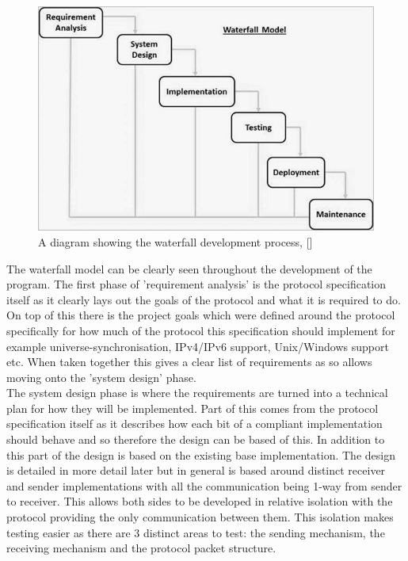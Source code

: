 \documentclass[11pt,a4paper]{article}
\begin{document}
\begin{figure}
	\includegraphics[width=\textwidth]{sdlc_waterfall_model.jpg}
	\caption{A diagram showing the waterfall development process, [\cite{waterfall-diagram}]}
	\label{waterfall-diag}
\end{figure}

The waterfall model can be clearly seen throughout the development of the program. The first phase of 'requirement analysis' is the protocol specification itself as it clearly lays out the goals of the protocol and what it is required to do. On top of this there is the project goals which were defined around the protocol specifically for how much of the protocol this specification should implement for example universe-synchronisation, IPv4/IPv6 support, Unix/Windows support etc. When taken together this gives a clear list of requirements as so allows moving onto the 'system design' phase.\\

The system design phase is where the requirements are turned into a technical plan for how they will be implemented. Part of this comes from the protocol specification itself as it describes how each bit of a compliant implementation should behave and so therefore the design can be based of this. In addition to this part of the design is based on the existing base implementation. The design is detailed in more detail later but in general is based around distinct receiver and sender implementations with all the communication being 1-way from sender to receiver. This allows both sides to be developed in relative isolation with the protocol providing the only communication between them. This isolation makes testing easier as there are 3 distinct areas to test: the sending mechanism, the receiving mechanism and the protocol packet structure.\\
\end{document}

